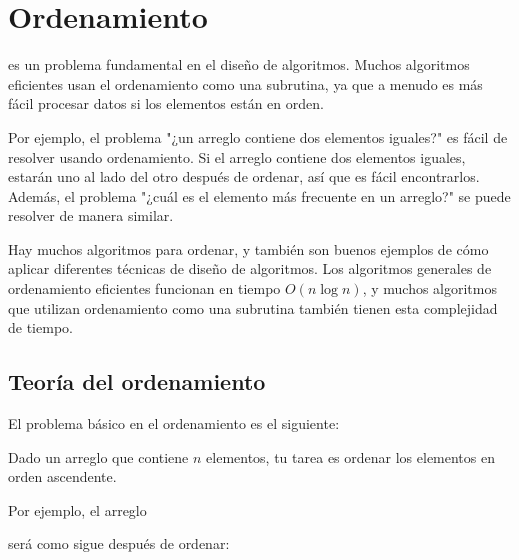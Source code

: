 \chapter{Ordenamiento}


es un problema fundamental en el diseño de algoritmos.
Muchos algoritmos eficientes
usan el ordenamiento como una subrutina,
ya que a menudo es más fácil procesar
datos si los elementos están en orden.

Por ejemplo, el problema "¿un arreglo contiene
dos elementos iguales?" es fácil de resolver usando ordenamiento.
Si el arreglo contiene dos elementos iguales,
estarán uno al lado del otro después de ordenar,
así que es fácil encontrarlos.
Además, el problema "¿cuál es el elemento más frecuente
en un arreglo?" se puede resolver de manera similar.

Hay muchos algoritmos para ordenar, y también son
buenos ejemplos de cómo aplicar
diferentes técnicas de diseño de algoritmos.
Los algoritmos generales de ordenamiento eficientes
funcionan en tiempo $O(n \log n)$,
y muchos algoritmos que utilizan ordenamiento
como una subrutina también
tienen esta complejidad de tiempo.

\section{Teoría del ordenamiento}

El problema básico en el ordenamiento es el siguiente:
\begin{framed}
\noindent
Dado un arreglo que contiene $n$ elementos,
tu tarea es ordenar los elementos
en orden ascendente.
\end{framed}
\noindent
Por ejemplo, el arreglo
\begin{center}
\end{center}
será como sigue después de ordenar:
\begin{center}
\end{center}

